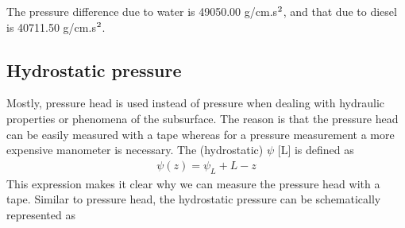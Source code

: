 \documentclass[letterpaper,10pt,english]{sphinxmanual}
\begin{document}
\begin{sphinxVerbatim}[commandchars=\\\{\}]
   
   


   
   

   
  
        
\end{sphinxVerbatim}

\begin{sphinxVerbatim}[commandchars=\\\{\}]
The pressure difference due to water is 49050.00 g/cm.s\(\sp{\text{2}}\), and that due to diesel is 40711.50 g/cm.s\(\sp{\text{2}}\).
\end{sphinxVerbatim}


\subsection{Hydrostatic pressure}
\label{\detokenize{contents/flow/lecture_03/13_gw_storage:hydrostatic-pressure}}
Mostly, pressure head is used instead of pressure when dealing with hydraulic properties or phenomena of the subsurface. The reason is that the pressure head can be easily measured with a tape whereas for a pressure measurement a more expensive manometer is necessary. The (hydrostatic)  \(\psi\) {[}L{]} is defined as
\begin{equation*}
\begin{split}
\psi(z) = \psi_L + L - z
\end{split}
\end{equation*}
This expression makes it clear why we can measure the pressure head with a tape. Similar to pressure head, the hydrostatic pressure can be schematically represented as
\end{document}
